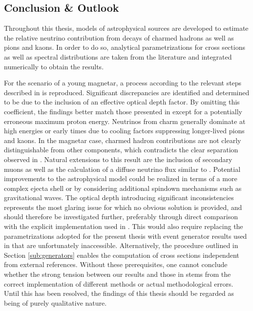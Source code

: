 \begin{spacing}{0.990}
	\chapter{Conclusion \& Outlook}
	\label{ch:conclusion}
	
	Throughout this thesis, models of astrophysical sources are developed to estimate the relative neutrino contribution from
	decays of charmed hadrons as well as pions and kaons. In order to do so, analytical parametrizations for cross sections as well as
	spectral distributions are taken from the literature and integrated numerically to obtain the results.
	
	For the scenario of a young magnetar, a process according to the relevant steps described in \cite{Carpio_2020} is reproduced. Significant
	discrepancies are identified and determined to be due to the inclusion of an effective optical depth factor. By omitting this coefficient,
	the findings better match those presented in \cite{Carpio_2020} except for a potentially erroneous maximum proton energy. Neutrinos
	from charm generally dominate at high energies or early times due to cooling factors suppressing longer-lived pions and kaons.
	In the magnetar case, charmed hadron contributions are not clearly distinguishable from other components, which contradicts
	the clear separation observed in \cite{Carpio_2020}. Natural extensions to this result are the inclusion of secondary muons as
	well as the calculation of a diffuse neutrino flux similar to \cite{Carpio_2020}. Potential improvements to the astrophysical model
	could be realized in terms of a more complex ejecta shell or by considering additional spindown mechanisms such as gravitational
	waves. The optical depth introducing significant inconsistencies represents the most glaring issue for which no obvious solution is
	provided, and should therefore be investigated further, preferably through direct comparison with the explicit implementation used in
	\cite{Carpio_2020}. This would also require replacing the parametrizations adopted for the present thesis with event
	generator results used in \cite{Carpio_2020} that are unfortunately inaccessible. Alternatively, the procedure
	outlined in Section \ref{sub:generators} enables the computation of cross sections independent from external references.
	Without these prerequisites, one cannot conclude whether the strong tension between our results and those in \cite{Carpio_2020}
	stems from the correct implementation of different methods or actual methodological errors. Until this has been resolved, the
	findings of this thesis should be regarded as being of purely qualitative nature.
	

\end{spacing}
